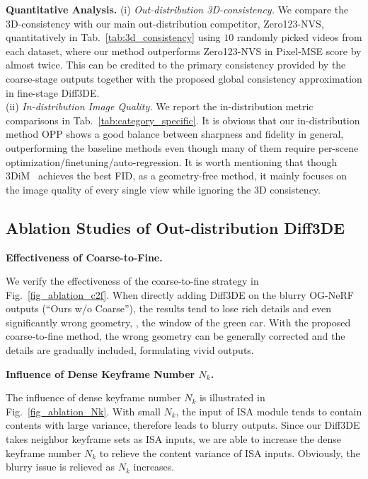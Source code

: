 \noindent\textbf{Quantitative Analysis.}
(i) \textit{Out-distribution 3D-consistency.}
We compare the 3D-consistency with our main out-distribution competitor, Zero123-NVS, quantitatively in Tab.~\ref{tab:3d_consistency} using $10$ randomly picked videos from each dataset, where our method outperforms Zero123-NVS in Pixel-MSE score by almost twice. This can be credited to the primary consistency provided by the coarse-stage outputs together with the proposed global consistency approximation in fine-stage Diff3DE. 
\\
\noindent (ii) \textit{In-distribution Image Quality.}
We report the in-distribution metric comparisons in Tab.~\ref{tab:category_specific}. It is obvious that our in-distribution method OPP shows a good balance between sharpness and fidelity in general, outperforming the baseline methods even though many of them require per-scene optimization/finetuning/auto-regression. It is worth mentioning that though 3DiM~\cite{watson20223DiM} achieves the best FID, as a geometry-free method, it mainly focuses on the image quality of every single view while ignoring the 3D consistency.  





\subsection{\textbf{Ablation Studies of Out-distribution Diff3DE}}
\label{sec:ablation_Diff3DE}


\noindent\textbf{Effectiveness of Coarse-to-Fine.}

We verify the effectiveness of the coarse-to-fine strategy in Fig.~\ref{fig_ablation_c2f}. When directly adding Diff3DE on the blurry OG-NeRF outputs (``Ours w/o Coarse''), the results tend to lose rich details and even significantly wrong geometry, \eg, the window of the green car. With the proposed coarse-to-fine method, the wrong geometry can be generally corrected and the details are gradually included, formulating vivid outputs.

\noindent\textbf{Influence of Dense Keyframe Number $N_k$.}

The influence of dense keyframe number $N_k$ is illustrated in Fig.~\ref{fig_ablation_Nk}. With small $N_k$, the input of ISA module tends to contain contents with large variance, therefore leads to blurry outputs. Since our Diff3DE takes neighbor keyframe sets as ISA inputs, we are able to increase the dense keyframe number $N_k$ to relieve the content variance of ISA inputs. Obviously, the blurry issue is relieved as $N_k$ increases.


